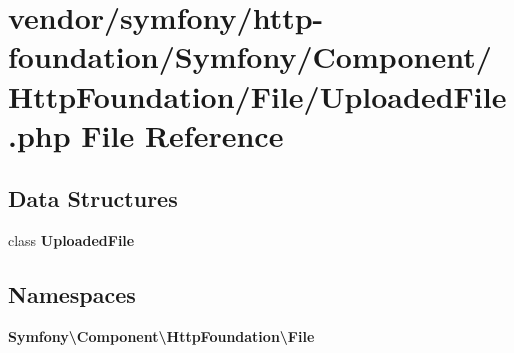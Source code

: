\section{vendor/symfony/http-\/foundation/\+Symfony/\+Component/\+Http\+Foundation/\+File/\+Uploaded\+File.php File Reference}
\label{_uploaded_file_8php}
\subsection*{Data Structures}
\begin{DoxyCompactItemize}
\item 
class {\bf Uploaded\+File}
\end{DoxyCompactItemize}
\subsection*{Namespaces}
\begin{DoxyCompactItemize}
\item 
 {\bf Symfony\textbackslash{}\+Component\textbackslash{}\+Http\+Foundation\textbackslash{}\+File}
\end{DoxyCompactItemize}
